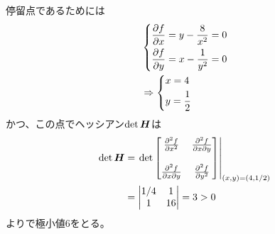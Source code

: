 \begin{ans*}
  停留点であるためには
  \begin{align}
    &\begin{dcases*}
      \ppar{f}{x} = y - \frac{8}{x^2} = 0 \\
      \ppar{f}{y} = x - \frac{1}{y^2} = 0
    \end{dcases*}\\
    &\Rightarrow
    \begin{dcases*}
      x = 4 \\
      y = \frac{1}{2}
    \end{dcases*}
  \end{align}
  かつ、この点でヘッシアン$\det\bm{H}$は
  \begin{align}
    \det\bm{H}
    &=
    \left.
    \det 
    \begin{bmatrix}
    \frac{\partial^2f}{\partial x^2} & \frac{\partial^2f}{\partial x\partial y} \\
    \\
    \frac{\partial^2f}{\partial x\partial y} & \frac{\partial^2f}{\partial y^2}
    \end{bmatrix}\right|_{(x,y) = (4,1/2)} \\
    &=
    \begin{vmatrix}
      1/4 & 1 \\
      1 & 16
    \end{vmatrix}
    = 3 > 0
  \end{align}
  よりで極小値6をとる。
\end{ans*}

